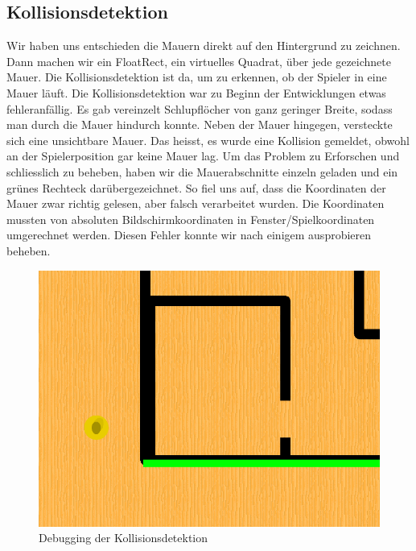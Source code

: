 \documentclass[11pt,a4paper]{scrbook}
\begin{document}
\subsection{Kollisionsdetektion}
Wir haben uns entschieden die Mauern direkt auf den Hintergrund zu zeichnen. Dann machen wir ein FloatRect, ein virtuelles Quadrat,
über jede gezeichnete Mauer. Die Kollisionsdetektion ist da, um zu erkennen, ob der Spieler in eine Mauer läuft.
Die Kollisionsdetektion war zu Beginn der Entwicklungen etwas fehleranfällig. Es gab vereinzelt
Schlupflöcher von ganz geringer Breite, sodass man durch die Mauer hindurch konnte. Neben der Mauer hingegen,
versteckte sich eine unsichtbare Mauer. Das heisst, es wurde eine Kollision gemeldet, obwohl an der
Spielerposition gar keine Mauer lag. Um das Problem zu Erforschen und schliesslich zu beheben, haben
wir die Mauerabschnitte einzeln geladen und ein grünes Rechteck darübergezeichnet. So fiel uns auf, dass
die Koordinaten der Mauer zwar richtig gelesen, aber falsch verarbeitet wurden. Die Koordinaten mussten
von absoluten Bildschirmkoordinaten in Fenster/Spielkoordinaten umgerechnet werden. Diesen Fehler konnte wir nach einigem ausprobieren beheben.

\begin{figure}[h]
\centering
\includegraphics[scale=0.3]{img/kollisionsdetektion.png}
\caption{Debugging der Kollisionsdetektion}
\end{figure}
\end{document}
